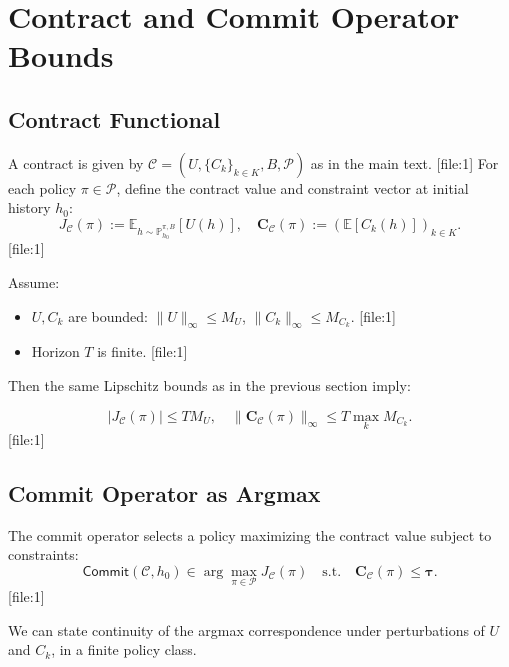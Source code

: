 \documentclass[11pt,a4paper]{article}
\theoremstyle{tealstyle}
\theoremstyle{definition}
\begin{document}
\section{Contract and Commit Operator Bounds}

\subsection{Contract Functional}

A contract is given by \(\mathcal{C} = (U, \{C_k\}_{k\in K}, B, \mathcal{P})\) as in the main text. [file:1] For each policy \(\pi \in \mathcal{P}\), define the contract value and constraint vector at initial history \(h_0\):
\[
  J_{\mathcal{C}}(\pi) := \mathbb{E}_{h \sim \mathbb{P}^{\pi,B}_{h_0}}[U(h)], \quad
  \mathbf{C}_{\mathcal{C}}(\pi) := \left( \mathbb{E}[C_k(h)] \right)_{k\in K}.
\] [file:1]

Assume:

\begin{itemize}[noitemsep]
  \item \(U, C_k\) are bounded: \(\|U\|_\infty \le M_U\), \(\|C_k\|_\infty \le M_{C_k}\). [file:1]
  \item Horizon \(T\) is finite. [file:1]
\end{itemize}

Then the same Lipschitz bounds as in the previous section imply:

\[
  |J_{\mathcal{C}}(\pi)| \le T M_U, \quad
  \|\mathbf{C}_{\mathcal{C}}(\pi)\|_\infty \le T \max_k M_{C_k}.
\] [file:1]

\subsection{Commit Operator as Argmax}

The commit operator selects a policy maximizing the contract value subject to constraints:
\[
  \mathsf{Commit}(\mathcal{C}, h_0) \in \arg\max_{\pi \in \mathcal{P}} J_{\mathcal{C}}(\pi)
  \quad \text{s.t.} \quad
  \mathbf{C}_{\mathcal{C}}(\pi) \le \boldsymbol{\tau}.
\] [file:1]

We can state continuity of the argmax correspondence under perturbations of \(U\) and \(C_k\), in a finite policy class.
\end{document}
